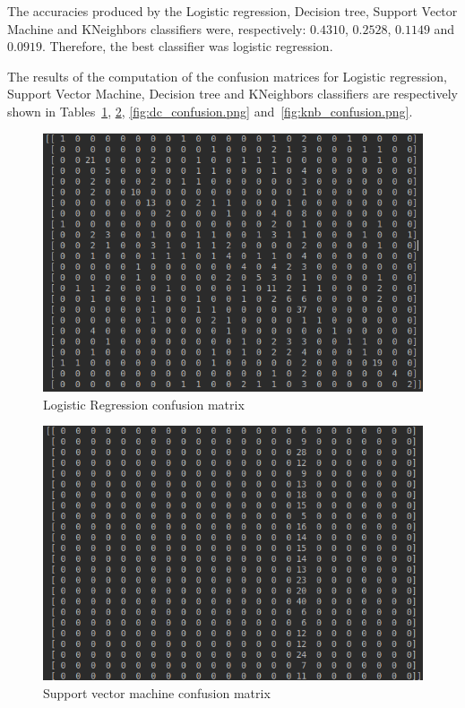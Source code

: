 \documentclass{article} %
\begin{document}
 The accuracies produced by the Logistic regression, Decision tree, Support Vector Machine and KNeighbors classifiers were, respectively: $0.4310$, $0.2528$, $0.1149$ and $0.0919$. Therefore, the best classifier was logistic regression.
 
 The results of the computation of the confusion matrices for  Logistic regression, Support Vector Machine, Decision tree and KNeighbors classifiers are respectively shown in Tables~\ref{fig:lr_confusion.png}, \ref{fig:SVM_confusion.png}, \ref{fig:dc_confusion.png} and~\ref{fig:knb_confusion.png}.
\hfill
\begin{figure}
	\includegraphics[width=\linewidth]{lr_confusion.png}
	\caption{Logistic Regression confusion matrix}
	\label{fig:lr_confusion.png}
\end{figure}

\begin{figure}
	\includegraphics[width=\linewidth]{SVM_confusion.png}
	\caption{Support vector machine confusion matrix}
	\label{fig:SVM_confusion.png}
\end{figure}
\end{document}

